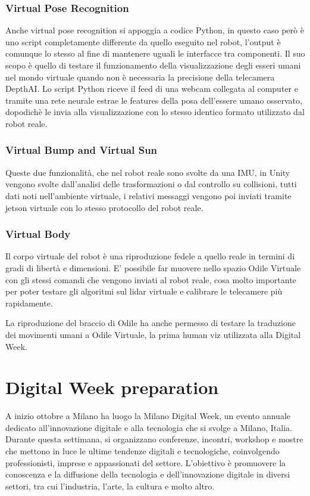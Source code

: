 \documentclass{Configuration_Files/PoliMi3i_thesis}
\begin{document}
\subsubsection{Virtual Pose Recognition}

Anche virtual pose recognition si appoggia a codice Python, in questo caso però è uno script completamente differente da quello eseguito nel robot, l’output è comunque lo stesso al fine di mantenere uguali le interfacce tra componenti. Il suo scopo è quello di testare il funzionamento della visualizzazione degli esseri umani nel mondo virtuale quando non è necessaria la precisione della telecamera DepthAI. Lo script Python riceve il feed di una webcam collegata al computer e tramite una rete neurale estrae le features della posa dell’essere umano osservato, dopodichè le invia alla visualizzazione con lo stesso identico formato utilizzato dal robot reale.

\subsubsection{Virtual Bump and Virtual Sun}

Queste due funzionalità, che nel robot reale sono svolte da una IMU, in Unity vengono svolte dall’analisi delle trasformazioni o dal controllo su collisioni, tutti dati noti nell’ambiente virtuale, i relativi messaggi vengono poi inviati tramite jetson virtuale con lo stesso protocollo del robot reale.

\subsubsection{Virtual Body}

Il corpo virtuale del robot è una riproduzione fedele a quello reale in termini di gradi di libertà e dimensioni. E’ possibile far muovere nello spazio Odile Virtuale con gli stessi comandi che vengono inviati al robot reale, cosa molto importante per poter testare gli algoritmi sul lidar virtuale e calibrare le telecamere più rapidamente.

La riproduzione del braccio di Odile ha anche permesso di testare la traduzione dei movimenti umani a Odile Virtuale, la prima human viz utilizzata alla Digital Week.

\section{Digital Week preparation}

A inizio ottobre a Milano ha luogo la Milano Digital Week, un evento annuale dedicato all'innovazione digitale e alla tecnologia che si svolge a Milano, Italia. Durante questa settimana, si organizzano conferenze, incontri, workshop e mostre che mettono in luce le ultime tendenze digitali e tecnologiche, coinvolgendo professionisti, imprese e appassionati del settore. L'obiettivo è promuovere la conoscenza e la diffusione della tecnologia e dell'innovazione digitale in diversi settori, tra cui l'industria, l'arte, la cultura e molto altro.
\end{document}
